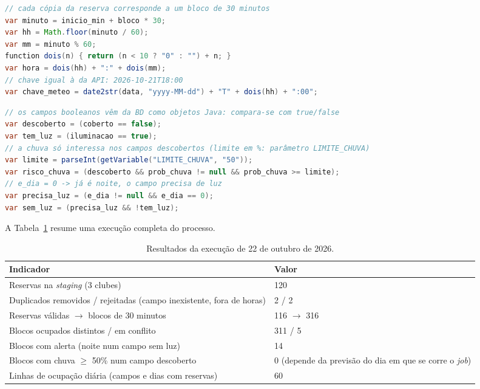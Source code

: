 \documentclass[11pt,a4paper]{article}
\begin{document}
\begin{lstlisting}[language=Java, caption={Passo \textit{Hora do bloco} (Modified JavaScript value).}, label={lst:hora}]
// cada cópia da reserva corresponde a um bloco de 30 minutos
var minuto = inicio_min + bloco * 30;
var hh = Math.floor(minuto / 60);
var mm = minuto % 60;
function dois(n) { return (n < 10 ? "0" : "") + n; }
var hora = dois(hh) + ":" + dois(mm);
// chave igual à da API: 2026-10-21T18:00
var chave_meteo = date2str(data, "yyyy-MM-dd") + "T" + dois(hh) + ":00";
\end{lstlisting}

\begin{lstlisting}[language=Java, caption={Passo \textit{Calcular alertas} (Modified JavaScript value).}, label={lst:alertas}]
// os campos booleanos vêm da BD como objetos Java: compara-se com true/false
var descoberto = (coberto == false);
var tem_luz = (iluminacao == true);
// a chuva só interessa nos campos descobertos (limite em %: parâmetro LIMITE_CHUVA)
var limite = parseInt(getVariable("LIMITE_CHUVA", "50"));
var risco_chuva = (descoberto && prob_chuva != null && prob_chuva >= limite);
// e_dia = 0 -> já é noite, o campo precisa de luz
var precisa_luz = (e_dia != null && e_dia == 0);
var sem_luz = (precisa_luz && !tem_luz);
\end{lstlisting}

A Tabela~\ref{tab:resultados} resume uma execução completa do processo.

\begin{table}[H]
\centering
\caption{Resultados da execução de 22 de outubro de 2026.}
\label{tab:resultados}
\small
\renewcommand{\arraystretch}{1.2}
\begin{tabular}{@{}p{10cm}p{4.8cm}@{}}
\toprule
\textbf{Indicador} & \textbf{Valor} \\
\midrule
Reservas na \textit{staging} (3 clubes) & 120 \\
Duplicados removidos / rejeitadas (campo inexistente, fora de horas) & 2 / 2 \\
Reservas válidas $\rightarrow$ blocos de 30 minutos & 116 $\rightarrow$ 316 \\
Blocos ocupados distintos / em conflito & 311 / 5 \\
Blocos com alerta (noite num campo sem luz) & 14 \\
Blocos com chuva $\geq$ 50\% num campo descoberto & 0 (depende da previsão do dia em que se corre o \textit{job}) \\
Linhas de ocupação diária (campos e dias com reservas) & 60 \\
\bottomrule
\end{tabular}
\end{table}
\end{document}
